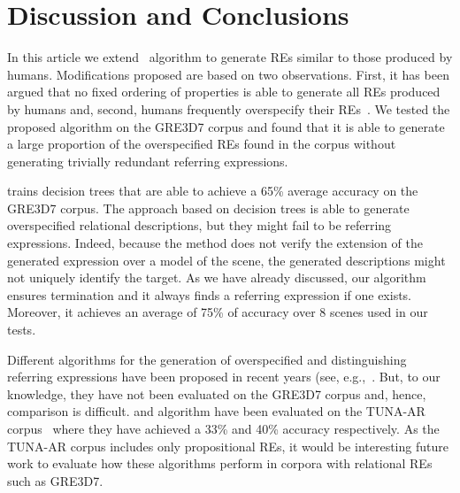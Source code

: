 \section{Discussion and Conclusions} \label{sec:discussion}

In this article we extend~ algorithm to generate REs similar to those produced by humans. Modifications 
proposed are based on two observations. First, it has been argued that no fixed ordering of properties is able to generate all REs produced by humans and, second, humans frequently overspecify their REs~\cite{Engelhardt_Bailey_Ferreira_2006,Arts_Maes_Noordman_Jansen_2011,viet:gene11}. We tested 
the proposed algorithm on the GRE3D7 corpus and found that it is able to generate a large proportion of the overspecified REs found in the corpus without generating trivially redundant referring expressions.

 trains decision trees that are able to achieve a 65\% average accuracy on the GRE3D7 corpus. 
The approach based on decision trees is able to generate overspecified relational descriptions, but they might fail to be referring 
expressions. Indeed, because the  method does not verify the extension of the generated expression over a model of the scene, the 
generated descriptions might not uniquely identify the target.  As we have already discussed,
our algorithm ensures termination and it always finds a referring expression if one exists.  Moreover, it achieves an average of 75\% of accuracy over 8 scenes used in our tests. 

Different algorithms for the generation of overspecified and distinguishing referring expressions have been proposed in recent years 
(see, e.g.,~\cite{delucena-paraboni:2008:ENLG,ruud-emiel-mariet:2012:INLG2012}.  But, to our knowledge, they have not been evaluated on the 
GRE3D7 corpus and, hence, comparison is difficult.  and  algorithm
have been evaluated on the TUNA-AR corpus~\cite{gatt-balz-kow:2008:ENLG} where they have achieved a 33\% and 40\% accuracy respectively. 
As the TUNA-AR corpus includes only propositional REs, it would be interesting future work to evaluate how these algorithms perform in corpora with relational REs such as GRE3D7. 

